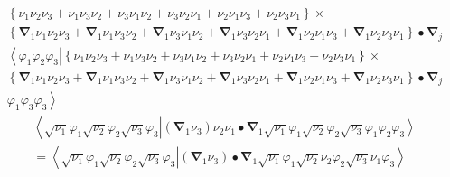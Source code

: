 \documentclass[aps,preprint]{revtex4}%
\begin{document}
\begin{align}
& \left\{  \nu_{1}\nu_{2}\nu_{3}+\nu_{1}\nu_{3}\nu_{2}+\nu_{3}\nu_{1}\nu
_{2}+\nu_{3}\nu_{2}\nu_{1}+\nu_{2}\nu_{1}\nu_{3}+\nu_{2}\nu_{3}\nu
_{1}\right\}  \times\\
& \left\{  \mathbf{\nabla}_{1}\nu_{1}\nu_{2}\nu_{3}+\mathbf{\nabla}_{1}\nu
_{1}\nu_{3}\nu_{2}+\mathbf{\nabla}_{1}\nu_{3}\nu_{1}\nu_{2}+\mathbf{\nabla
}_{1}\nu_{3}\nu_{2}\nu_{1}+\mathbf{\nabla}_{1}\nu_{2}\nu_{1}\nu_{3}%
+\mathbf{\nabla}_{1}\nu_{2}\nu_{3}\nu_{1}\right\}  \bullet\mathbf{\nabla}_{j}%
\end{align}%
\begin{align}
& \left\langle \varphi_{1}\varphi_{2}\varphi_{3}\right\vert \left\{  \nu
_{1}\nu_{2}\nu_{3}+\nu_{1}\nu_{3}\nu_{2}+\nu_{3}\nu_{1}\nu_{2}+\nu_{3}\nu
_{2}\nu_{1}+\nu_{2}\nu_{1}\nu_{3}+\nu_{2}\nu_{3}\nu_{1}\right\}  \times\\
& \left\{  \mathbf{\nabla}_{1}\nu_{1}\nu_{2}\nu_{3}+\mathbf{\nabla}_{1}\nu
_{1}\nu_{3}\nu_{2}+\mathbf{\nabla}_{1}\nu_{3}\nu_{1}\nu_{2}+\mathbf{\nabla
}_{1}\nu_{3}\nu_{2}\nu_{1}+\mathbf{\nabla}_{1}\nu_{2}\nu_{1}\nu_{3}%
+\mathbf{\nabla}_{1}\nu_{2}\nu_{3}\nu_{1}\right\}  \bullet\mathbf{\nabla}%
_{j}\\
& \left.  \varphi_{1}\varphi_{3}\varphi_{3}\right\rangle
\end{align}%
\begin{align}
& \left\langle \sqrt{\nu_{1}}\varphi_{1}\sqrt{\nu_{2}}\varphi_{2}\sqrt{\nu
_{3}}\varphi_{3}\right\vert \left(  \mathbf{\nabla}_{1}\nu_{3}\right)  \nu
_{2}\nu_{1}\bullet\mathbf{\nabla}_{1}\sqrt{\nu_{1}}\varphi_{1}\sqrt{\nu_{2}%
}\varphi_{2}\sqrt{\nu_{3}}\left.  \varphi_{1}\varphi_{2}\varphi_{3}%
\right\rangle \\
& =\left\langle \sqrt{\nu_{1}}\varphi_{1}\sqrt{\nu_{2}}\varphi_{2}\sqrt
{\nu_{3}}\varphi_{3}\right\vert \left(  \mathbf{\nabla}_{1}\nu_{3}\right)
\bullet\mathbf{\nabla}_{1}\left.  \sqrt{\nu_{1}}\varphi_{1}\sqrt{\nu_{2}}%
\nu_{2}\varphi_{2}\sqrt{\nu_{3}}\nu_{1}\varphi_{3}\right\rangle
\end{align}
%
\end{document}
